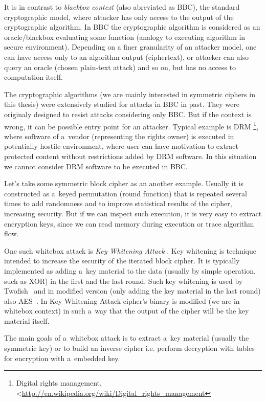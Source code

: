 \documentclass[11pt,oneside,final]{fithesis2}
\begin{document}
    It is in contrast to \emph{blackbox context} (also abreviated as BBC), the standard cryptographic model, where attacker has only access to the output of the cryptographic algorithm. 
    In BBC the cryptographic algorithm is considered as an oracle/blackbox evaluating some function (analogy to executing algorithm in secure environment).
    Depending on a finer granularity of an attacker model, one can have 
    access only to an algorithm output (ciphertext), or attacker can also query an oracle (chosen plain-text attack) and so on, but has no access to computation itself.

    The cryptographic algorithms (we are mainly interested in symmetric ciphers in this thesis) were extensively studied for attacks in BBC in past.
    They were originaly designed to resist attacks considering only BBC. But if the context is wrong, it can be possible entry point for an attacker.
    Typical example is DRM \footnote{Digital rights management, \textless\url{http://en.wikipedia.org/wiki/Digital_rights_management}}, where software of a~vendor
    (representing the rights owner) is executed in potentially hostile environment, where user can have motivation to extract protected content without
    restrictions added by DRM software. In this situation we cannot consider DRM software to be executed in BBC.
    
    Let's take some symmetric block cipher as an another example. Usually it is constructed as a~keyed permutation (round function) that is repeated 
    several times to add randomness and to improve statistical results of the cipher, increasing security. But if we can inspect such execution, it is 
    very easy to extract encryption keys, since we can read memory during execution or trace algorithm flow.
    
    One such whitebox attack is \emph{Key Whitening Attack} \cite{Kerins06acautionary}. Key whitening is technique intended to increase the security of the iterated block cipher.
    It is typically implemented as adding a~key material to the data (usually by simple operation, such as XOR) in the first and the last round. Such key whitening 
    is used by Twofish~\citep{Schneier98twofish:a} and in modified version (only adding the key material in the last round) also AES~\citep{2002-daemen}. In Key Whitening Attack
    cipher's binary is modified (we are in whitebox context) in such a~way that the output of the cipher will be the key material itself. 
    
    The main goals of a~whitebox attack is to extract a~key material (usually the symmetric key) or to build an inverse cipher i.e. perform decryption 
    with tables for encryption with a~embedded key.
\end{document}
